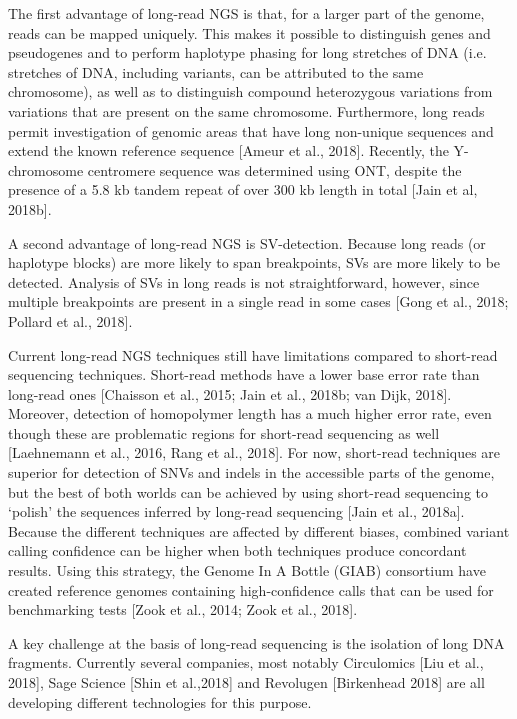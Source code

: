 {The first advantage of long-read NGS is that, for a larger part of the genome, reads can be mapped uniquely. 
This makes it possible to distinguish genes and pseudogenes and to perform haplotype phasing for long stretches of DNA (i.e. stretches of DNA, including variants, can be attributed to the same chromosome), as well as to distinguish compound heterozygous variations from variations that are present on the same chromosome. 
Furthermore, long reads permit investigation of genomic areas that have long non-unique sequences and extend the known reference sequence [Ameur et al., 2018]. 
Recently, the Y-chromosome centromere sequence was determined using ONT, despite the presence of a 5.8 kb tandem repeat of over 300 kb length in total [Jain et al, 2018b].

A second advantage of long-read NGS is SV-detection. Because long reads (or haplotype blocks) are more likely to span breakpoints, SVs are more likely to be detected. Analysis of SVs in long reads is not straightforward, however, since multiple breakpoints are present in a single read in some cases [Gong et al., 2018; Pollard et al., 2018].

Current long-read NGS techniques still have limitations compared to short-read sequencing techniques. 
Short-read methods have a lower base error rate than long-read ones [Chaisson et al., 2015; Jain et al., 2018b; van Dijk, 2018]. 
Moreover, detection of homopolymer length has a much higher error rate, even though these are problematic regions for short-read sequencing as well [Laehnemann et al., 2016, Rang et al., 2018]. 
For now, short-read techniques are superior for detection of SNVs and indels in the accessible parts of the genome, but the best of both worlds can be achieved by using short-read sequencing to ‘polish’ the sequences inferred by long-read sequencing [Jain et al., 2018a]. 
Because the different techniques are affected by different biases, combined variant calling confidence can be higher when both techniques produce concordant results. 
Using this strategy, the Genome In A Bottle (GIAB) consortium have created reference genomes containing high-confidence calls that can be used for benchmarking tests [Zook et al., 2014; Zook et al., 2018]. 

A key challenge at the basis of long-read sequencing is the isolation of long DNA fragments.
Currently several companies, most notably Circulomics [Liu et al., 2018], Sage Science [Shin et al.,2018] and Revolugen [Birkenhead 2018] are all developing different technologies for this purpose.

}
